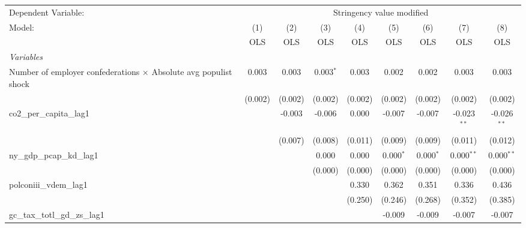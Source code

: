 
\begingroup
\centering
\begin{tabular}{lcccccccc}
   \toprule
   Dependent Variable: & \multicolumn{8}{c}{Stringency value modified}\\
   Model:                                                                  & (1)     & (2)     & (3)         & (4)     & (5)         & (6)         & (7)           & (8)\\  
                                                                           &  OLS    & OLS     & OLS         & OLS     & OLS         & OLS         & OLS           & OLS\\  
   \midrule
   \emph{Variables}\\
   Number of employer confederations $\times$ Absolute avg populist shock  & 0.003   & 0.003   & 0.003$^{*}$ & 0.003   & 0.002       & 0.002       & 0.003         & 0.003\\   
                                                                           & (0.002) & (0.002) & (0.002)     & (0.002) & (0.002)     & (0.002)     & (0.002)       & (0.002)\\   
   co2\_per\_capita\_lag1                                                  &         & -0.003  & -0.006      & 0.000   & -0.007      & -0.007      & -0.023$^{**}$ & -0.026$^{**}$\\   
                                                                           &         & (0.007) & (0.008)     & (0.011) & (0.009)     & (0.009)     & (0.011)       & (0.012)\\   
   ny\_gdp\_pcap\_kd\_lag1                                                 &         &         & 0.000       & 0.000   & 0.000$^{*}$ & 0.000$^{*}$ & 0.000$^{**}$  & 0.000$^{**}$\\   
                                                                           &         &         & (0.000)     & (0.000) & (0.000)     & (0.000)     & (0.000)       & (0.000)\\   
   polconiii\_vdem\_lag1                                                   &         &         &             & 0.330   & 0.362       & 0.351       & 0.336         & 0.436\\   
                                                                           &         &         &             & (0.250) & (0.246)     & (0.268)     & (0.352)       & (0.385)\\   
   gc\_tax\_totl\_gd\_zs\_lag1                                             &         &         &             &         & -0.009      & -0.009      & -0.007        & -0.007\\   

\end{tabular}
